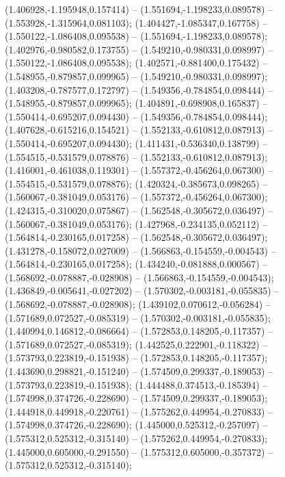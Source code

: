  (1.406928,-1.195948,0.157414) -- (1.551694,-1.198233,0.089578) -- (1.553928,-1.315964,0.081103);
 (1.404427,-1.085347,0.167758) -- (1.550122,-1.086408,0.095538) -- (1.551694,-1.198233,0.089578);
 (1.402976,-0.980582,0.173755) -- (1.549210,-0.980331,0.098997) -- (1.550122,-1.086408,0.095538);
 (1.402571,-0.881400,0.175432) -- (1.548955,-0.879857,0.099965) -- (1.549210,-0.980331,0.098997);
 (1.403208,-0.787577,0.172797) -- (1.549356,-0.784854,0.098444) -- (1.548955,-0.879857,0.099965);
 (1.404891,-0.698908,0.165837) -- (1.550414,-0.695207,0.094430) -- (1.549356,-0.784854,0.098444);
 (1.407628,-0.615216,0.154521) -- (1.552133,-0.610812,0.087913) -- (1.550414,-0.695207,0.094430);
 (1.411431,-0.536340,0.138799) -- (1.554515,-0.531579,0.078876) -- (1.552133,-0.610812,0.087913);
 (1.416001,-0.461038,0.119301) -- (1.557372,-0.456264,0.067300) -- (1.554515,-0.531579,0.078876);
 (1.420324,-0.385673,0.098265) -- (1.560067,-0.381049,0.053176) -- (1.557372,-0.456264,0.067300);
 (1.424315,-0.310020,0.075867) -- (1.562548,-0.305672,0.036497) -- (1.560067,-0.381049,0.053176);
 (1.427968,-0.234135,0.052112) -- (1.564814,-0.230165,0.017258) -- (1.562548,-0.305672,0.036497);
 (1.431278,-0.158072,0.027009) -- (1.566863,-0.154559,-0.004543) -- (1.564814,-0.230165,0.017258);
 (1.434240,-0.081888,0.000567) -- (1.568692,-0.078887,-0.028908) -- (1.566863,-0.154559,-0.004543);
 (1.436849,-0.005641,-0.027202) -- (1.570302,-0.003181,-0.055835) -- (1.568692,-0.078887,-0.028908);
 (1.439102,0.070612,-0.056284) -- (1.571689,0.072527,-0.085319) -- (1.570302,-0.003181,-0.055835);
 (1.440994,0.146812,-0.086664) -- (1.572853,0.148205,-0.117357) -- (1.571689,0.072527,-0.085319);
 (1.442525,0.222901,-0.118322) -- (1.573793,0.223819,-0.151938) -- (1.572853,0.148205,-0.117357);
 (1.443690,0.298821,-0.151240) -- (1.574509,0.299337,-0.189053) -- (1.573793,0.223819,-0.151938);
 (1.444488,0.374513,-0.185394) -- (1.574998,0.374726,-0.228690) -- (1.574509,0.299337,-0.189053);
 (1.444918,0.449918,-0.220761) -- (1.575262,0.449954,-0.270833) -- (1.574998,0.374726,-0.228690);
 (1.445000,0.525312,-0.257097) -- (1.575312,0.525312,-0.315140) -- (1.575262,0.449954,-0.270833);
 (1.445000,0.605000,-0.291550) -- (1.575312,0.605000,-0.357372) -- (1.575312,0.525312,-0.315140);
